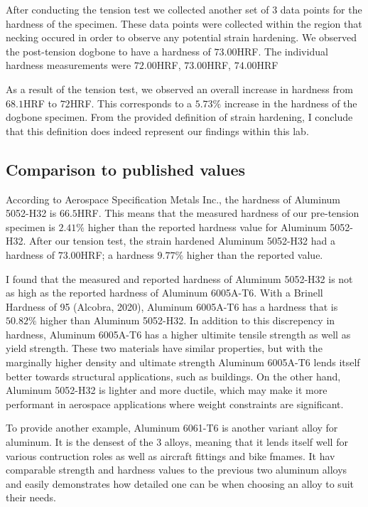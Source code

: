 \documentclass{article}
\begin{document}
After conducting the tension test we collected another set of 3 data points for the hardness of the specimen. These data points were collected within the region that necking occured in order to observe any potential strain hardening. We observed the post-tension dogbone to have a hardness of $73.00$HRF. The individual hardness measurements were $72.00$HRF, $73.00$HRF, $74.00$HRF

As a result of the tension test, we observed an overall increase in hardness from $68.1$HRF to $72$HRF. This corresponds to a $5.73\%$ increase in the hardness of the dogbone specimen. From the provided definition of strain hardening, I conclude that this definition does indeed represent our findings within this lab.

\subsection{Comparison to published values}

According to Aerospace Specification Metals Inc., the hardness of Aluminum 5052-H32 is $66.5$HRF. This means that the measured hardness of our pre-tension specimen is $2.41\%$ higher than the reported hardness value for Aluminum 5052-H32. After our tension test, the strain hardened Aluminum 5052-H32 had a hardness of $73.00$HRF; a hardness $9.77\%$ higher than the reported value.

I found that the measured and reported hardness of Aluminum 5052-H32 is not as high as the reported hardness of Aluminum 6005A-T6. With a Brinell Hardness of 95 (Alcobra, 2020), Aluminum 6005A-T6 has a hardness that is $50.82\%$ higher than Aluminum 5052-H32. In addition to this discrepency in hardness, Aluminum 6005A-T6 has a higher ultimite tensile strength as well as yield strength. These two materials have similar properties, but with the marginally higher density and ultimate strength Aluminum 6005A-T6 lends itself better towards structural applications, such as buildings. On the other hand, Aluminum 5052-H32 is lighter and more ductile, which may make it more performant in aerospace applications where weight constraints are significant.

To provide another example, Aluminum 6061-T6 is another variant alloy for aluminum. It is the densest of the 3 alloys, meaning that it lends itself well for various contruction roles as well as aircraft fittings and bike fmames. It hav comparable strength and hardness values to the previous two aluminum alloys and easily demonstrates how detailed one can be when choosing an alloy to suit their needs.
\end{document}
